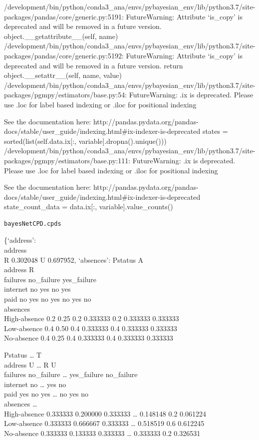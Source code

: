 \documentclass[
]{article}
\begin{document}
/development/bin/python/conda3\_ana/envs/pybayesian\_env/lib/python3.7/site-packages/pandas/core/generic.py:5191:
FutureWarning: Attribute `is\_copy' is deprecated and will be removed in
a future version. object.\_\_getattribute\_\_(self, name)
/development/bin/python/conda3\_ana/envs/pybayesian\_env/lib/python3.7/site-packages/pandas/core/generic.py:5192:
FutureWarning: Attribute `is\_copy' is deprecated and will be removed in
a future version. return object.\_\_setattr\_\_(self, name, value)
/development/bin/python/conda3\_ana/envs/pybayesian\_env/lib/python3.7/site-packages/pgmpy/estimators/base.py:54:
FutureWarning: .ix is deprecated. Please use .loc for label based
indexing or .iloc for positional indexing

See the documentation here:
http://pandas.pydata.org/pandas-docs/stable/user\_guide/indexing.html\#ix-indexer-is-deprecated
states = sorted(list(self.data.ix{[}:, variable{]}.dropna().unique()))
/development/bin/python/conda3\_ana/envs/pybayesian\_env/lib/python3.7/site-packages/pgmpy/estimators/base.py:111:
FutureWarning: .ix is deprecated. Please use .loc for label based
indexing or .iloc for positional indexing

See the documentation here:
http://pandas.pydata.org/pandas-docs/stable/user\_guide/indexing.html\#ix-indexer-is-deprecated
state\_count\_data = data.ix{[}:, variable{]}.value\_counts()

\begin{verbatim}
bayesNetCPD.cpds
\end{verbatim}

\{`address':\\
address\\
R 0.302048 U 0.697952, `absences': Pstatus A\\
address R\\
failures no\_failure yes\_failure\\
internet no yes no yes\\
paid no yes no yes no yes no\\
absences\\
High-absence 0.2 0.25 0.2 0.333333 0.2 0.333333 0.333333\\
Low-absence 0.4 0.50 0.4 0.333333 0.4 0.333333 0.333333\\
No-absence 0.4 0.25 0.4 0.333333 0.4 0.333333 0.333333

Pstatus \ldots{} T\\
address U \ldots{} R U\\
failures no\_failure \ldots{} yes\_failure no\_failure\\
internet no \ldots{} yes no\\
paid yes no yes \ldots{} no yes no\\
absences \ldots{}\\
High-absence 0.333333 0.200000 0.333333 \ldots{} 0.148148 0.2 0.061224\\
Low-absence 0.333333 0.666667 0.333333 \ldots{} 0.518519 0.6 0.612245\\
No-absence 0.333333 0.133333 0.333333 \ldots{} 0.333333 0.2 0.326531
\end{document}
